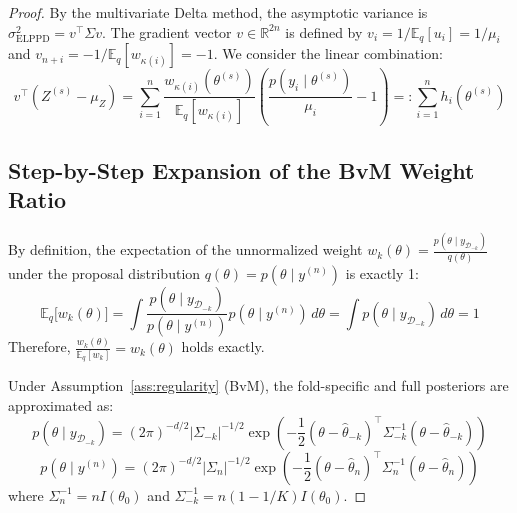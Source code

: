 \documentclass[12pt]{article}
\begin{document}
\begin{proof}
By the multivariate Delta method, the asymptotic variance is $\sigma^2_{\mathrm{ELPPD}} = v^\top \Sigma v$.
The gradient vector $v \in \mathbb{R}^{2n}$ is defined by $v_i = 1/\mathbb{E}_q[u_i] = 1/\mu_i$ and $v_{n+i} = -1/\mathbb{E}_q[w_{\kappa(i)}] = -1$.
We consider the linear combination:
\[
v^\top (Z^{(s)} - \mu_Z) = \sum_{i=1}^n \frac{w_{\kappa(i)}(\theta^{(s)})}{\mathbb{E}_q[w_{\kappa(i)}]} \left( \frac{p(y_i \mid \theta^{(s)})}{\mu_i} - 1 \right) =: \sum_{i=1}^n h_i(\theta^{(s)})
\]
\subsection{Step-by-Step Expansion of the BvM Weight Ratio}
By definition, the expectation of the unnormalized weight $w_k(\theta) = \frac{p(\theta \mid y_{\mathcal{D}_{-k}})}{q(\theta)}$ under the proposal distribution $q(\theta) = p(\theta \mid y^{(n)})$ is exactly 1:
\[
\mathbb{E}_q\big[w_k(\theta)\big] = \int \frac{p(\theta \mid y_{\mathcal{D}_{-k}})}{p(\theta \mid y^{(n)})} p(\theta \mid y^{(n)}) \, d\theta = \int p(\theta \mid y_{\mathcal{D}_{-k}}) \, d\theta = 1
\]
Therefore, $\frac{w_k(\theta)}{\mathbb{E}_q[w_k]} = w_k(\theta)$ holds exactly.

Under Assumption~\ref{ass:regularity} (BvM), the fold-specific and full posteriors are approximated as:
\[
p(\theta \mid y_{\mathcal{D}_{-k}}) = (2\pi)^{-d/2} |\Sigma_{-k}|^{-1/2} \exp\left( -\frac{1}{2} (\theta - \hat{\theta}_{-k})^\top \Sigma_{-k}^{-1} (\theta - \hat{\theta}_{-k}) \right)
\]
\[
p(\theta \mid y^{(n)}) = (2\pi)^{-d/2} |\Sigma_{n}|^{-1/2} \exp\left( -\frac{1}{2} (\theta - \hat{\theta}_n)^\top \Sigma_n^{-1} (\theta - \hat{\theta}_n) \right)
\]
where $\Sigma_n^{-1} = n I(\theta_0)$ and $\Sigma_{-k}^{-1} = n(1 - 1/K) I(\theta_0)$.


\end{proof}
\end{document}
